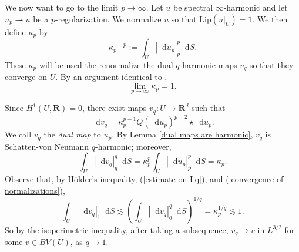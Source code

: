 \documentclass[reqno,11pt]{amsart}
\newcommand{\RR}{\mathbf{R}}
\newcommand*\dif{\mathop{}\!\mathrm{d}}
\newcommand{\Lip}{\mathrm{Lip}}
\newcommand{\dfn}[1]{\emph{#1}\index{#1}}
\newcommand{\weakto}{\rightharpoonup}
\theoremstyle{definition}
\numberwithin{equation}{section}
\begin{document}
We now want to go to the limit $p \to \infty$.
Let $u$ be spectral $\infty$-harmonic and let $u_p \weakto u$ be a $p$-regularization.
We normalize $u$ so that $\Lip(u|_U) = 1$.
We then define $\kappa_p$ by 
\begin{equation}\label{normalization condition}
\kappa_p^{1 - p} := \int_U |\dif u_p|_{p}^p \dif S.
\end{equation}
These $\kappa_p$ will be used the renormalize the dual $q$-harmonic maps $v_q$ so that they converge on $U$.
By an argument identical to \cite[Lemma 6.1]{daskalopoulos2022analytic},
\begin{equation}\label{convergence of normalizations}
\lim_{p \to \infty} \kappa_p = 1.
\end{equation}

Since $H^1(U, \RR) = 0$, there exist maps $v_q: U \to \RR^d$ such that
\begin{equation}\label{normalized dual map}
\dif v_q = \kappa_p^{p - 1} Q(\dif u_p)^{p - 2} \star \dif u_p.
\end{equation}
We call $v_q$ the \dfn{dual map} to $u_p$.
By Lemma \ref{dual maps are harmonic}, $v_q$ is Schatten-von Neumann $q$-harmonic; moreover,
\begin{equation}\label{estimate on Lq}
\int_U |\dif v_q|_{q}^q \dif S = \kappa_p^p \int_U |\dif u_p|_{p}^p \dif S = \kappa_p.
\end{equation}
Observe that, by H\"older's inequality, (\ref{estimate on Lq}), and (\ref{convergence of normalizations}),
$$\int_U |\dif v_q|_{1} \dif S \lesssim \left(\int_U |\dif v_q|_{q}^q \dif S\right)^{1/q} = \kappa_p^{1/q} \lesssim 1.$$
So by the isoperimetric inequality, after taking a subsequence, $v_q \to v$ in $L^{3/2}$ for some $v \in BV(U)$, as $q \to 1$.
\end{document}
